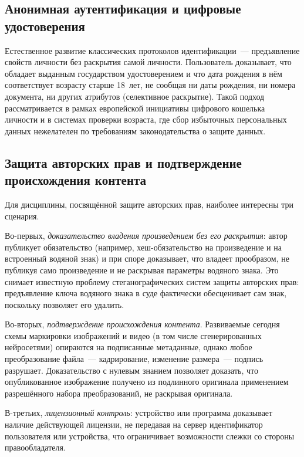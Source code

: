 \documentclass[14pt,a4paper]{extarticle}
\begin{document}
\subsection{Анонимная аутентификация и цифровые удостоверения}

Естественное развитие классических протоколов идентификации~--- предъявление свойств
личности без раскрытия самой личности. Пользователь доказывает, что обладает выданным
государством удостоверением и что дата рождения в нём соответствует возрасту старше
18~лет, не сообщая ни даты рождения, ни номера документа, ни других атрибутов
(селективное раскрытие). Такой подход рассматривается в рамках европейской инициативы
цифрового кошелька личности и в системах проверки возраста, где сбор избыточных
персональных данных нежелателен по требованиям законодательства о защите данных.

\subsection{Защита авторских прав и подтверждение происхождения контента}

Для дисциплины, посвящённой защите авторских прав, наиболее интересны три сценария.

Во-первых, \emph{доказательство владения произведением без его раскрытия}: автор
публикует обязательство (например, хеш-обязательство на произведение и на встроенный
водяной знак) и при споре доказывает, что владеет прообразом, не публикуя само
произведение и не раскрывая параметры водяного знака. Это снимает известную проблему
стеганографических систем защиты авторских прав: предъявление ключа водяного знака в
суде фактически обесценивает сам знак, поскольку позволяет его удалить.

Во-вторых, \emph{подтверждение происхождения контента}. Развиваемые сегодня схемы
маркировки изображений и видео (в том числе сгенерированных нейросетями) опираются на
подписанные метаданные, однако любое преобразование файла~--- кадрирование, изменение
размера~--- подпись разрушает. Доказательство с нулевым знанием позволяет доказать, что
опубликованное изображение получено из подлинного оригинала применением разрешённого
набора преобразований, не раскрывая оригинала.

В-третьих, \emph{лицензионный контроль}: устройство или программа доказывает наличие
действующей лицензии, не передавая на сервер идентификатор пользователя или устройства,
что ограничивает возможности слежки со стороны правообладателя.
\end{document}
